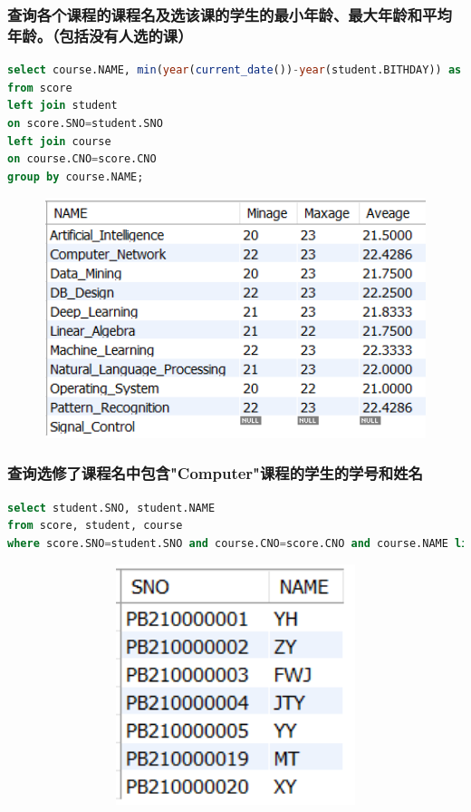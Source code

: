 \documentclass{ctexart}
\begin{document}
\subsubsection{查询各个课程的课程名及选该课的学生的最小年龄、最大年龄和平均年龄。（包括没有人选的课）}
\begin{lstlisting}[language=sql]
select course.NAME, min(year(current_date())-year(student.BITHDAY)) as Minage,  max(year(current_date())-year(student.BITHDAY)) as Maxage, avg(year(current_date())-year(student.BITHDAY)) as aveage
from score
left join student
on score.SNO=student.SNO
left join course 
on course.CNO=score.CNO
group by course.NAME;
\end{lstlisting}
\begin{figure}[H]
	\centering 
	\includegraphics[height=7cm,width=14cm]{42.png}
	\end{figure}
\subsubsection{查询选修了课程名中包含"Computer"课程的学生的学号和姓名}
\begin{lstlisting}[language=sql]
select student.SNO, student.NAME
from score, student, course 
where score.SNO=student.SNO and course.CNO=score.CNO and course.NAME like 'Computer%';
\end{lstlisting}
\begin{figure}[H]
	\centering 
	\includegraphics[height=7cm,width=14cm]{43.png}
	\end{figure}
\end{document}
